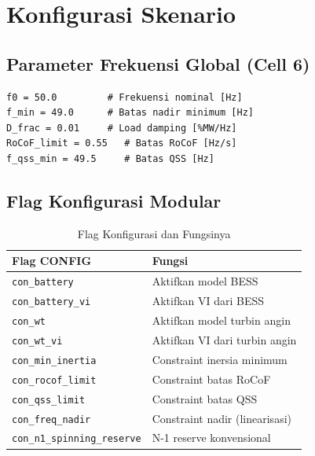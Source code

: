 \documentclass[journal]{IEEEtran}
\begin{document}
\section{Konfigurasi Skenario}
\label{sec:config}

\subsection{Parameter Frekuensi Global (Cell 6)}

\begin{lstlisting}[style=pycode,caption={Parameter frekuensi global}]
f0 = 50.0         # Frekuensi nominal [Hz]
f_min = 49.0      # Batas nadir minimum [Hz]
D_frac = 0.01     # Load damping [%MW/Hz]
RoCoF_limit = 0.55   # Batas RoCoF [Hz/s]
f_qss_min = 49.5     # Batas QSS [Hz]
\end{lstlisting}

\subsection{Flag Konfigurasi Modular}

\begin{table}[!t]\renewcommand{\arraystretch}{1.2}
\caption{Flag Konfigurasi dan Fungsinya}
\label{tab:config}
\centering\footnotesize
\begin{tabular}{lp{5.5cm}}
\toprule
Flag CONFIG & Fungsi \\ \midrule
\texttt{con\_battery}        & Aktifkan model BESS \\
\texttt{con\_battery\_vi}    & Aktifkan VI dari BESS \\
\texttt{con\_wt}             & Aktifkan model turbin angin \\
\texttt{con\_wt\_vi}         & Aktifkan VI dari turbin angin \\
\texttt{con\_min\_inertia}   & Constraint inersia minimum \\
\texttt{con\_rocof\_limit}   & Constraint batas RoCoF \\
\texttt{con\_qss\_limit}     & Constraint batas QSS \\
\texttt{con\_freq\_nadir}    & Constraint nadir (linearisasi) \\
\texttt{con\_n1\_spinning\_reserve} & N-1 reserve konvensional \\
\bottomrule
\end{tabular}
\end{table}
\end{document}
